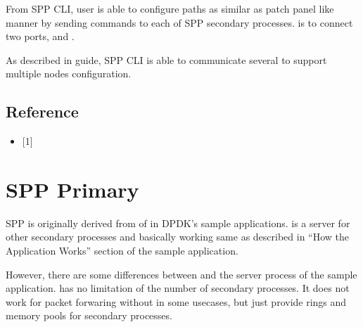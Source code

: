 \documentclass[a4paper,11pt,openany,oneside,english]{sphinxmanual}
\begin{document}
From SPP CLI, user is able to configure paths as similar as
patch panel like manner by sending commands to each of SPP secondary processes.
 is to connect two ports,  and .

As described in {\hyperref[\detokenize{gsg/howto_use:spp-setup-howto-use-spp-cli}]{}} guide,
SPP CLI is able to communicate several  to support multiple nodes
configuration.


\subsection{Reference}
\label{\detokenize{design/spp_controller:reference}}\begin{itemize}
\item {} 
{[}1{]} 

\end{itemize}


\section{SPP Primary}
\label{\detokenize{design/spp_primary:spp-primary}}\label{\detokenize{design/spp_primary:spp-overview-design-spp-primary}}\label{\detokenize{design/spp_primary::doc}}
SPP is originally derived from
of
in DPDK’s sample applications.
 is a server for other secondary processes and
basically working same as described in
“How the Application Works” section of the sample application.

However, there are some differences between  and
the server process of the sample application.
 has no limitation of the number of secondary processes.
It does not work for packet forwaring without in some usecases, but just
provide rings and memory pools for secondary processes.
\end{document}
